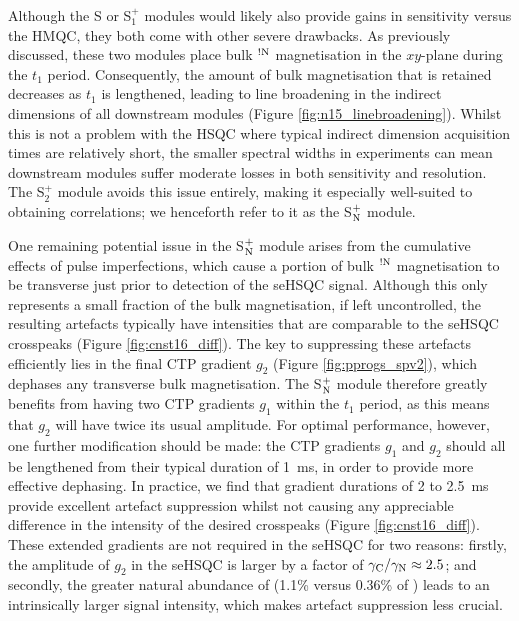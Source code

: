 \documentclass[11pt]{article}
\newcommand*{\noahS}{S}
\newcommand*{\noahSpa}{S$^+_1$}
\newcommand*{\noahSpb}{S$^+_2$}
\newcommand*{\noahSpn}{S$\rm ^+_N$}
\newcommand*{\hl}[1]{\textcolor{WildStrawberry}{#1}}
\newcommand*{\carbon}{\ce{^{13}C}}
\newcommand*{\nitrogen}{\ce{^{15}N}}
\newcommand*{\magnnot}[1]{\ce{^1H}$^{!#1}$}
\newcommand*{\figref}[1]{Figure \ref{fig:#1}}
\begin{document}
\hl{Although the \nitrogen{} \noahS{} or \noahSpa{} modules would likely also provide gains in sensitivity versus the HMQC, they both come with other severe drawbacks.}
As previously discussed, these two modules place bulk \magnnot{\ce{N}} magnetisation in the $xy$-plane during the $t_1$ period.
Consequently, the amount of bulk magnetisation that is retained decreases as $t_1$ is lengthened, leading to line broadening in the indirect dimensions of all downstream modules (\figref{n15_linebroadening}).
Whilst this is not a problem with the \carbon{} HSQC where typical \carbon{} indirect dimension acquisition times are relatively short, the smaller spectral widths in \nitrogen{} experiments can mean downstream modules suffer moderate losses in both sensitivity and resolution.
The \noahSpb{} module avoids this issue entirely, making it especially well-suited to obtaining \nitrogen{} correlations; \hl{we henceforth refer to it as the \noahSpn{} module.}

One remaining potential issue in the \noahSpn{} module arises from the cumulative effects of pulse imperfections, which cause a portion of bulk \magnnot{\ce{N}} magnetisation to be transverse just prior to detection of the seHSQC signal.
Although this only represents a small fraction of the bulk magnetisation, if left uncontrolled, the resulting artefacts typically have intensities that are comparable to the seHSQC crosspeaks (\figref{cnst16_diff}).
The key to suppressing these artefacts efficiently lies in the final CTP gradient $g_2$ (Figure \ref{fig:pprogs_spv2}), which dephases any transverse bulk magnetisation.
The \noahSpn{} module therefore greatly benefits from having two CTP gradients $g_1$ within the $t_1$ period, as this means that $g_2$ will have twice its usual amplitude.
For optimal performance, however, \hl{one further modification should be made:} the CTP gradients $g_1$ and $g_2$ should all be lengthened from their typical duration of \SI{1}{\ms}, in order to provide more effective dephasing.
In practice, we find that gradient durations of 2 to \SI{2.5}{\ms} provide excellent artefact suppression whilst not causing any appreciable difference in the intensity of the desired crosspeaks (\figref{cnst16_diff}).
These extended gradients are not required in the \carbon{} seHSQC for two reasons: firstly, the amplitude of $g_2$ in the \carbon{} seHSQC is larger by a factor of $\gamma_{\ce{C}}/\gamma_{\ce{N}} \approx 2.5$; and secondly, the greater natural abundance of \carbon{} (1.1\% versus 0.36\% of \nitrogen{}) leads to an intrinsically larger signal intensity\hl{, which makes artefact suppression less crucial.}
\end{document}
